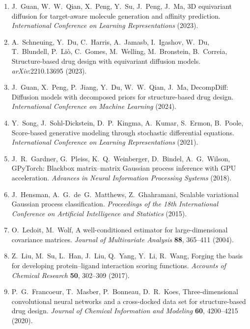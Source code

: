 \documentclass{article}
\begin{document}
\begin{enumerate}[leftmargin=2em,itemsep=1pt,label=\textit{\arabic*}.]

\item J.~Guan, W.~W.~Qian, X.~Peng, Y.~Su, J.~Peng, J.~Ma,
  3D equivariant diffusion for target-aware molecule generation and
  affinity prediction.
  \textit{International Conference on Learning Representations} (2023).

\item A.~Schneuing, Y.~Du, C.~Harris, A.~Jamasb, I.~Igashov,
  W.~Du, T.~Blundell, P.~Li\`o, C.~Gomes, M.~Welling,
  M.~Bronstein, B.~Correia,
  Structure-based drug design with equivariant diffusion models.
  \textit{arXiv}:2210.13695 (2023).

\item J.~Guan, X.~Peng, P.~Jiang, Y.~Du, W.~W.~Qian, J.~Ma,
  DecompDiff: Diffusion models with decomposed priors for
  structure-based drug design.
  \textit{International Conference on Machine Learning} (2024).

\item Y.~Song, J.~Sohl-Dickstein, D.~P.~Kingma, A.~Kumar,
  S.~Ermon, B.~Poole,
  Score-based generative modeling through stochastic differential
  equations.
  \textit{International Conference on Learning Representations} (2021).

\item J.~R.~Gardner, G.~Pleiss, K.~Q.~Weinberger, D.~Bindel,
  A.~G.~Wilson,
  GPyTorch: Blackbox matrix--matrix Gaussian process inference with GPU
  acceleration.
  \textit{Advances in Neural Information Processing Systems} (2018).

\item J.~Hensman, A.~G.~de~G.~Matthews, Z.~Ghahramani,
  Scalable variational Gaussian process classification.
  \textit{Proceedings of the 18th International Conference on
  Artificial Intelligence and Statistics} (2015).

\item O.~Ledoit, M.~Wolf,
  A well-conditioned estimator for large-dimensional covariance
  matrices.
  \textit{Journal of Multivariate Analysis} \textbf{88}, 365--411
  (2004).

\item Z.~Liu, M.~Su, L.~Han, J.~Liu, Q.~Yang, Y.~Li, R.~Wang,
  Forging the basis for developing protein--ligand interaction scoring
  functions.
  \textit{Accounts of Chemical Research} \textbf{50}, 302--309 (2017).

\item P.~G.~Francoeur, T.~Masber, P.~Bonneau, D.~R.~Koes,
  Three-dimensional convolutional neural networks and a
  cross-docked data set for structure-based drug design.
  \textit{Journal of Chemical Information and Modeling} \textbf{60},
  4200--4215 (2020).


\end{enumerate}
\end{document}
